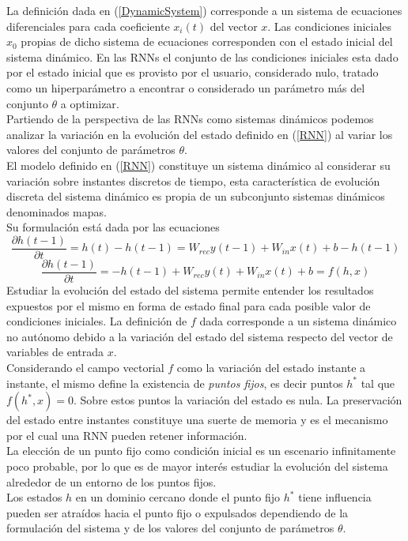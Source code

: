 \documentclass{article}
\begin{document}
	La definición dada en (\ref{DynamicSystem}) corresponde a un sistema de ecuaciones diferenciales para cada coeficiente $x_i(t)$ del vector $x$. Las condiciones iniciales $x_0$ propias de dicho sistema de ecuaciones corresponden con el estado inicial del sistema dinámico. En las RNNs el conjunto de las condiciones iniciales esta dado por el estado inicial que es provisto por el usuario, considerado nulo, tratado como un hiperparámetro a encontrar o considerado un parámetro más del conjunto $\theta$ a optimizar\cite{22IntroBackpropagation}.\\
	Partiendo de la perspectiva de las RNNs como sistemas dinámicos podemos analizar la variación en la evolución del estado definido en (\ref{RNN}) al variar los valores del conjunto de parámetros $\theta$.\\
	El modelo definido en (\ref{RNN}) constituye un sistema dinámico al considerar su variación sobre instantes discretos de tiempo\cite{10Pascanu}, esta característica de evolución discreta del sistema dinámico es propia de un subconjunto sistemas dinámicos denominados mapas.\\
	Su formulación está dada por las ecuaciones
	\begin{equation*}
	\dfrac{\partial h(t-1)}{\partial t} = h(t) - h(t-1) =  W_{rec} y(t-1) + W_{in} x(t) + b - h(t-1)
	\end{equation*}
	\begin{equation}\label{RNNdynamics}
	\dfrac{\partial h(t-1)}{\partial t} = - h(t-1) + W_{rec}y(t) + W_{in} x(t) + b = f(h, x)
	\end{equation}
	Estudiar la evolución del estado del sistema permite entender los resultados expuestos por el mismo en forma de estado final para cada posible valor de condiciones iniciales. La definición de $f$ dada corresponde a un sistema dinámico no autónomo debido a la variación del estado del sistema respecto del vector de variables de entrada $x$.\\
	
	Considerando el campo vectorial $f$ como la variación del estado instante a instante, el mismo define la existencia de \textit{puntos fijos}, es decir puntos $h^*$ tal que $f(h^*, x) = 0$. Sobre estos puntos la variación del estado es nula. La preservación del estado entre instantes constituye una suerte de memoria y es el mecanismo por el cual una RNN pueden retener información.\\
	
	La elección de un punto fijo como condición inicial es un escenario infinitamente poco probable, por lo que es de mayor interés estudiar la evolución del sistema alrededor de un entorno de los puntos fijos. \\
	Los estados $h$ en un dominio cercano donde el punto fijo $h^*$ tiene influencia pueden ser atraídos hacia el punto fijo o expulsados dependiendo de la formulación del sistema y de los valores del conjunto de parámetros $\theta$. \\
	
\end{document}
